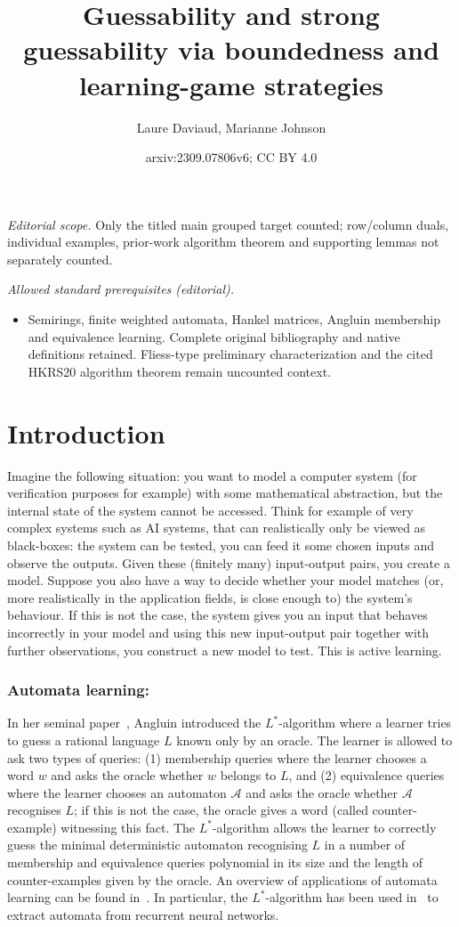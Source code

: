 \documentclass[10pt,a4paper]{amsart}
\title{Guessability and strong guessability via boundedness and learning-game strategies}
\author{Laure Daviaud, Marianne Johnson}
\date{arxiv:2309.07806v6; CC BY 4.0}
\theoremstyle{definition}
\numberwithin{equation}{section}
\numberwithin{theorem}{section}
\begin{document}
\maketitle
\noindent\textit{Editorial scope.} Only the titled main grouped target counted; row/column duals, individual examples, prior-work algorithm theorem and supporting lemmas not separately counted.\par\medskip
\noindent\textit{Allowed standard prerequisites (editorial).}\begin{itemize}
\item Semirings, finite weighted automata, Hankel matrices, Angluin membership and equivalence learning. Complete original bibliography and native definitions retained. Fliess-type preliminary characterization and the cited HKRS20 algorithm theorem remain uncounted context.
\end{itemize}\medskip
\section{Introduction}\label{section:intro}
Imagine the following situation: you want to model a computer system (for verification purposes for example) with some mathematical abstraction, but the internal state of the system cannot be accessed. Think for example of very complex systems such as AI systems, that can realistically only be viewed as black-boxes: the system can be tested, you can feed it some chosen inputs and observe the outputs. Given these (finitely many)  input-output pairs, you create a model. Suppose you also have a way to decide whether your model matches (or, more realistically in the application fields, is close enough to) the system's behaviour. If this is not the case, the system gives you an input that behaves incorrectly in your model and using this new input-output pair together with further observations, you construct a new model to test. This is active learning.   

\subsubsection*{\textbf{Automata learning:}} In her seminal paper~\cite{A87}, Angluin introduced the $L^*$-algorithm where a learner tries to guess a rational language $L$ known only by an oracle. The learner is allowed to ask two types of queries: (1) membership queries where the learner chooses a word $w$ and asks the oracle whether $w$ belongs to $L$, and (2) equivalence queries where the learner chooses an automaton $\mathcal{A}$ and asks the oracle whether $\mathcal{A}$ recognises $L$; if this is not the case, the oracle gives a word (called counter-example) witnessing this fact. The $L^*$-algorithm allows the learner to correctly guess  the minimal deterministic automaton recognising $L$ in a  number of membership and equivalence queries polynomial in its size and the length of counter-examples given by the oracle. An overview of applications of automata learning can be found in~\cite{L06,HS16,V17}. In particular, the $L^*$-algorithm has been used in~\cite{WGY18} to extract automata from recurrent neural networks.
\end{document}
